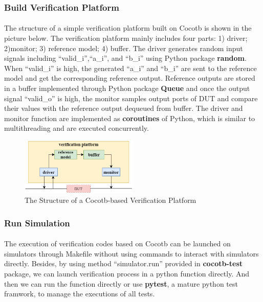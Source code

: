 \documentclass{article}
\begin{document}
\subsubsection{Build Verification Platform}
\paragraph{}
The structure of a simple verification platform built on Cocotb is shown in the picture below. The verification platform mainly includes four parts: 1) driver; 2)monitor; 3) reference model; 4) buffer. The driver generates random input signals including  “valid_i”,“a_i”, and “b_i” using Python package \textbf{random}. When “valid_i” is high, the generated “a_i” and “b_i” are sent to the reference model and get the corresponding reference output. Reference outputs are stored in a buffer implemented through Python package \textbf{Queue} and once the output signal “valid_o” is high, the monitor samples output ports of DUT and compare their values with the reference output dequeued from buffer. The driver and monitor function are implemented as \textbf{coroutines} of Python, which is similar to multithreading and are executed concurrently.

\begin{figure}[h]
\centering
\includegraphics[width=0.5\textwidth]{verification_platform.png}
\caption{\label{fig:frame6} The Structure of a Cocotb-based Verification Platform}
\end{figure}

\subsubsection{Run Simulation}
\paragraph{}
The execution of verification codes based on Cocotb can be launched on simulators through Makefile without using commands to interact with simulators directly. Besides, by using method “simulator.run” provided in \textbf{cocotb-test} package, we can launch verification process in a python function directly. And then we can run the function directly or use \textbf{pytest}, a mature python test framwork, to manage the executions of all tests.
\end{document}
